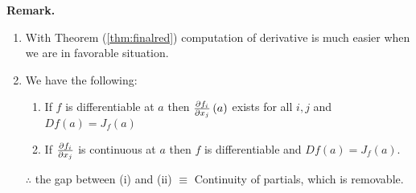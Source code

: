 \documentclass[../Analysis-3]{subfiles}
\begin{document}
\textbf{Remark.}
\begin{enumerate}
  \item With Theorem (\ref{thm:finalred}) computation of derivative is much easier when we are in favorable situation.
  \item We have the following: \begin{enumerate}[label = (\roman*)]
          \item If $ f $ is differentiable at $ a $ then $ \pdv{f_i}{x_j}\left( a \right) $ exists for all $ i, j $ and $ Df(a) = J_{f}(a) $
          \item If $ \pdv{f_i}{x_j} $ is continuous at $ a $ then $ f $ is differentiable and $ Df(a) = J_{f}(a) $.
        \end{enumerate}
        $ \therefore $ the gap between (i) and (ii) $ \equiv $ Continuity of partials, which is removable.
\end{enumerate}
\end{document}
